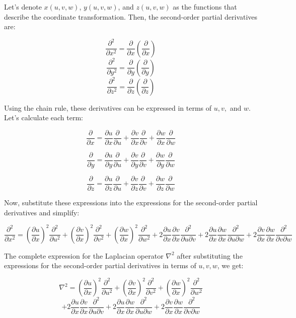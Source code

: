 \documentclass[a4paper, 12pt]{article}
\begin{document}
Let's denote \( x(u, v, w) \), \( y(u, v, w) \), and \( z(u, v, w) \) as the functions that describe the coordinate transformation. Then, the second-order partial derivatives are:

\[ \frac{\partial^2}{\partial x^2} = \frac{\partial}{\partial x}\left(\frac{\partial}{\partial x}\right) \]
\[ \frac{\partial^2}{\partial y^2} = \frac{\partial}{\partial y}\left(\frac{\partial}{\partial y}\right) \]
\[ \frac{\partial^2}{\partial z^2} = \frac{\partial}{\partial z}\left(\frac{\partial}{\partial z}\right) \]

Using the chain rule, these derivatives can be expressed in terms of \( u, v, \) and \( w \). Let's calculate each term:

\[ \frac{\partial}{\partial x} = \frac{\partial u}{\partial x}\frac{\partial}{\partial u} + \frac{\partial v}{\partial x}\frac{\partial}{\partial v} + \frac{\partial w}{\partial x}\frac{\partial}{\partial w} \]

\[ \frac{\partial}{\partial y} = \frac{\partial u}{\partial y}\frac{\partial}{\partial u} + \frac{\partial v}{\partial y}\frac{\partial}{\partial v} + \frac{\partial w}{\partial y}\frac{\partial}{\partial w} \]

\[ \frac{\partial}{\partial z} = \frac{\partial u}{\partial z}\frac{\partial}{\partial u} + \frac{\partial v}{\partial z}\frac{\partial}{\partial v} + \frac{\partial w}{\partial z}\frac{\partial}{\partial w} \]

Now, substitute these expressions into the expressions for the second-order partial derivatives and simplify:

\[ \frac{\partial^2}{\partial x^2} = \left(\frac{\partial u}{\partial x}\right)^2\frac{\partial^2}{\partial u^2} + \left(\frac{\partial v}{\partial x}\right)^2\frac{\partial^2}{\partial v^2} + \left(\frac{\partial w}{\partial x}\right)^2\frac{\partial^2}{\partial w^2} + 2\frac{\partial u}{\partial x}\frac{\partial v}{\partial x}\frac{\partial^2}{\partial u\partial v} + 2\frac{\partial u}{\partial x}\frac{\partial w}{\partial x}\frac{\partial^2}{\partial u\partial w} + 2\frac{\partial v}{\partial x}\frac{\partial w}{\partial x}\frac{\partial^2}{\partial v\partial w} \]



The complete expression for the Laplacian operator \( \nabla^2 \) after substituting the expressions for the second-order partial derivatives in terms of \( u, v, w \), we get:

\[ \nabla^2 = \left(\frac{\partial u}{\partial x}\right)^2\frac{\partial^2}{\partial u^2} + \left(\frac{\partial v}{\partial x}\right)^2\frac{\partial^2}{\partial v^2} + \left(\frac{\partial w}{\partial x}\right)^2\frac{\partial^2}{\partial w^2} \]
\[ + 2\frac{\partial u}{\partial x}\frac{\partial v}{\partial x}\frac{\partial^2}{\partial u\partial v} + 2\frac{\partial u}{\partial x}\frac{\partial w}{\partial x}\frac{\partial^2}{\partial u\partial w} + 2\frac{\partial v}{\partial x}\frac{\partial w}{\partial x}\frac{\partial^2}{\partial v\partial w} \]
\end{document}
